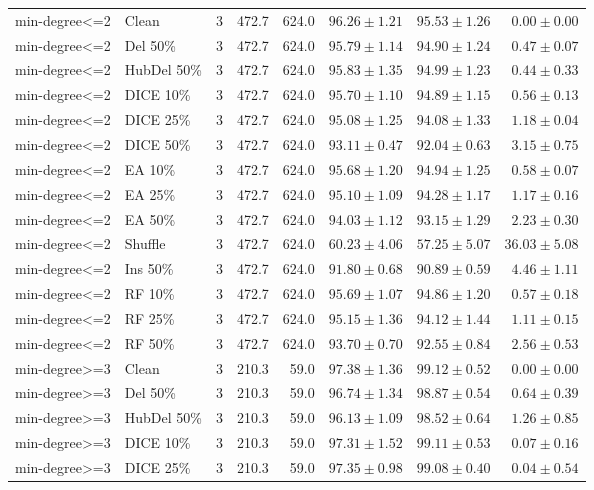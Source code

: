 {\begin{longtable}{llrrrrrr}
min-degree<=2 & Clean & 3 & 472.7 & 624.0 & $96.26\pm1.21$ & $95.53\pm1.26$ & $0.00\pm0.00$ \\
min-degree<=2 & Del 50\% & 3 & 472.7 & 624.0 & $95.79\pm1.14$ & $94.90\pm1.24$ & $0.47\pm0.07$ \\
min-degree<=2 & HubDel 50\% & 3 & 472.7 & 624.0 & $95.83\pm1.35$ & $94.99\pm1.23$ & $0.44\pm0.33$ \\
min-degree<=2 & DICE 10\% & 3 & 472.7 & 624.0 & $95.70\pm1.10$ & $94.89\pm1.15$ & $0.56\pm0.13$ \\
min-degree<=2 & DICE 25\% & 3 & 472.7 & 624.0 & $95.08\pm1.25$ & $94.08\pm1.33$ & $1.18\pm0.04$ \\
min-degree<=2 & DICE 50\% & 3 & 472.7 & 624.0 & $93.11\pm0.47$ & $92.04\pm0.63$ & $3.15\pm0.75$ \\
min-degree<=2 & EA 10\% & 3 & 472.7 & 624.0 & $95.68\pm1.20$ & $94.94\pm1.25$ & $0.58\pm0.07$ \\
min-degree<=2 & EA 25\% & 3 & 472.7 & 624.0 & $95.10\pm1.09$ & $94.28\pm1.17$ & $1.17\pm0.16$ \\
min-degree<=2 & EA 50\% & 3 & 472.7 & 624.0 & $94.03\pm1.12$ & $93.15\pm1.29$ & $2.23\pm0.30$ \\
min-degree<=2 & Shuffle & 3 & 472.7 & 624.0 & $60.23\pm4.06$ & $57.25\pm5.07$ & $36.03\pm5.08$ \\
min-degree<=2 & Ins 50\% & 3 & 472.7 & 624.0 & $91.80\pm0.68$ & $90.89\pm0.59$ & $4.46\pm1.11$ \\
min-degree<=2 & RF 10\% & 3 & 472.7 & 624.0 & $95.69\pm1.07$ & $94.86\pm1.20$ & $0.57\pm0.18$ \\
min-degree<=2 & RF 25\% & 3 & 472.7 & 624.0 & $95.15\pm1.36$ & $94.12\pm1.44$ & $1.11\pm0.15$ \\
min-degree<=2 & RF 50\% & 3 & 472.7 & 624.0 & $93.70\pm0.70$ & $92.55\pm0.84$ & $2.56\pm0.53$ \\
min-degree>=3 & Clean & 3 & 210.3 & 59.0 & $97.38\pm1.36$ & $99.12\pm0.52$ & $0.00\pm0.00$ \\
min-degree>=3 & Del 50\% & 3 & 210.3 & 59.0 & $96.74\pm1.34$ & $98.87\pm0.54$ & $0.64\pm0.39$ \\
min-degree>=3 & HubDel 50\% & 3 & 210.3 & 59.0 & $96.13\pm1.09$ & $98.52\pm0.64$ & $1.26\pm0.85$ \\
min-degree>=3 & DICE 10\% & 3 & 210.3 & 59.0 & $97.31\pm1.52$ & $99.11\pm0.53$ & $0.07\pm0.16$ \\
min-degree>=3 & DICE 25\% & 3 & 210.3 & 59.0 & $97.35\pm0.98$ & $99.08\pm0.40$ & $0.04\pm0.54$ \\

\end{longtable}}
